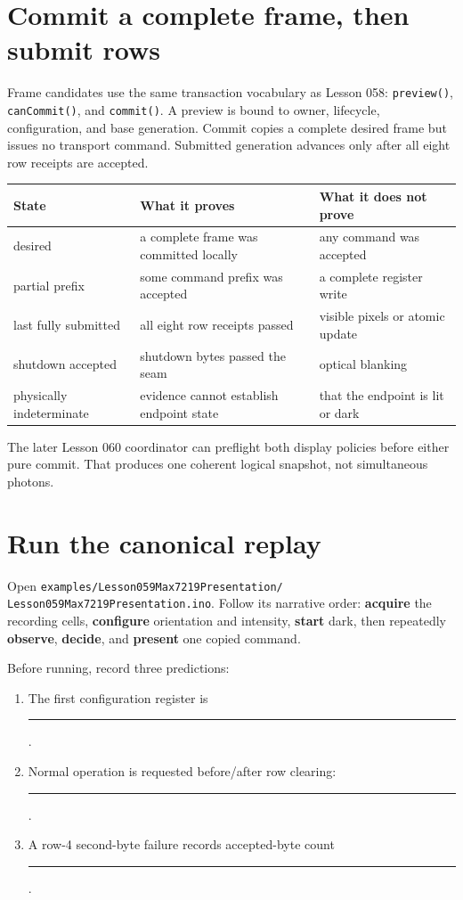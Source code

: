 \documentclass[10pt]{article}
\newcommand{\blankline}{\rule{0.76in}{0.4pt}}
\begin{document}
\section{Commit a complete frame, then submit rows}
Frame candidates use the same transaction vocabulary as Lesson 058:
\texttt{preview()}, \texttt{canCommit()}, and \texttt{commit()}. A preview is
bound to owner, lifecycle, configuration, and base generation. Commit copies a
complete desired frame but issues no transport command. Submitted generation
advances only after all eight row receipts are accepted.

\begin{tabularx}{\linewidth}{@{}l X X@{}}
\toprule
State & What it proves & What it does not prove\\
\midrule
desired & a complete frame was committed locally & any command was accepted\\
partial prefix & some command prefix was accepted & a complete register write\\
last fully submitted & all eight row receipts passed & visible pixels or atomic update\\
shutdown accepted & shutdown bytes passed the seam & optical blanking\\
physically indeterminate & evidence cannot establish endpoint state & that the endpoint is lit or dark\\
\bottomrule
\end{tabularx}

The later Lesson 060 coordinator can preflight both display policies before
either pure commit. That produces one coherent logical snapshot, not
simultaneous photons.

\section{Run the canonical replay}
Open
\texttt{examples/Lesson059Max7219Presentation/}\\
\texttt{Lesson059Max7219Presentation.ino}. Follow its narrative order:
\textbf{acquire} the recording cells, \textbf{configure} orientation and
intensity, \textbf{start} dark, then repeatedly
\textbf{observe}, \textbf{decide}, and \textbf{present} one copied command.

Before running, record three predictions:
\begin{enumerate}
 \item The first configuration register is \blankline.
 \item Normal operation is requested before/after row clearing: \blankline.
 \item A row-4 second-byte failure records accepted-byte count \blankline.
\end{enumerate}
\end{document}
